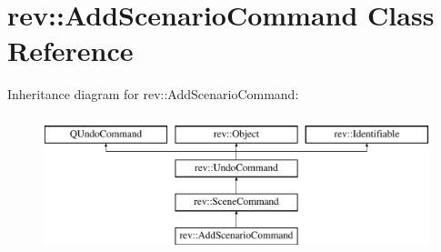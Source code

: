 \hypertarget{classrev_1_1_add_scenario_command}{}\section{rev\+::Add\+Scenario\+Command Class Reference}
\label{classrev_1_1_add_scenario_command}
Inheritance diagram for rev\+::Add\+Scenario\+Command\+:\begin{figure}[H]
\begin{center}
\leavevmode
\includegraphics[height=4.000000cm]{classrev_1_1_add_scenario_command}
\end{center}
\end{figure}
